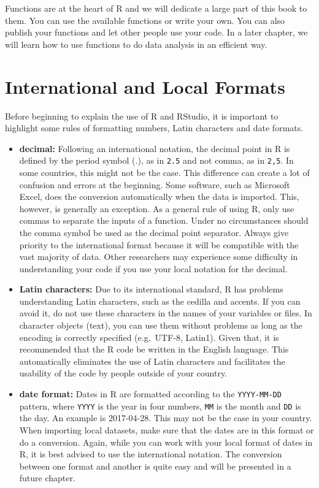 \documentclass[11pt,]{book}
\begin{document}
Functions are at the heart of R and we will dedicate a large part of
this book to them. You can use the available functions or write your
own. You can also publish your functions and let other people use your
code. In a later chapter, we will learn how to use functions to do data
analysis in an efficient way.

\section{International and Local
Formats}\label{international-and-local-formats}

Before beginning to explain the use of R and RStudio, it is important to
highlight some rules of formatting numbers, Latin characters and date
formats.

\begin{itemize}
\item
  \textbf{decimal:} Following an international notation, the decimal
  point in R is defined by the period symbol (.), as in \texttt{2.5} and
  not comma, as in \texttt{2,5}. In some countries, this might not be
  the case. This difference can create a lot of confusion and errors at
  the beginning. Some software, such as Microsoft Excel, does the
  conversion automatically when the data is imported. This, however, is
  generally an exception. As a general rule of using R, only use commas
  to separate the inputs of a function. Under no circumstances should
  the comma symbol be used as the decimal point separator. Always give
  priority to the international format because it will be compatible
  with the vast majority of data. Other researchers may experience some
  difficulty in understanding your code if you use your local notation
  for the decimal. 
\item
  \textbf{Latin characters:} Due to its international standard, R has
  problems understanding Latin characters, such as the cedilla and
  accents. If you can avoid it, do not use these characters in the names
  of your variables or files. In character objects (text), you can use
  them without problems as long as the encoding is correctly specified
  (e.g.~UTF-8, Latin1). Given that, it is recommended that the R code be
  written in the English language. This automatically eliminates the use
  of Latin characters and facilitates the usability of the code by
  people outside of your country.  
\item
  \textbf{date format:} Dates in R are formatted according to the
  \texttt{YYYY-MM-DD} pattern, where \texttt{YYYY} is the year in four
  numbers, \texttt{MM} is the month and \texttt{DD} is the day. An
  example is 2017-04-28. This may not be the case in your country. When
  importing local datasets, make sure that the dates are in this format
  or do a conversion. Again, while you can work with your local format
  of dates in R, it is best advised to use the international notation.
  The conversion between one format and another is quite easy and will
  be presented in a future chapter. 
\end{itemize}
\end{document}
